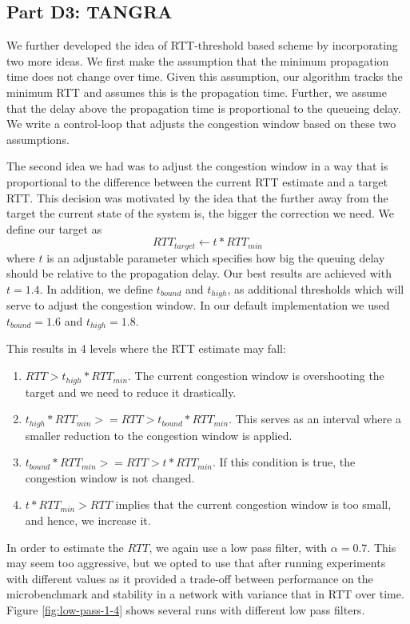\documentclass[12pt]{article}
\begin{document}
\subsection*{Part D3: TANGRA}

We further developed the idea of RTT-threshold based scheme by incorporating two
more ideas. We first make the assumption that the minimum propagation time does
not change over time. Given this assumption, our algorithm tracks the minimum
RTT and assumes this is the propagation time. Further, we assume that the delay
above the propagation time is proportional to the queueing delay. We write a
control-loop that adjusts the congestion window based on these two assumptions.

The second idea we had was to adjust the congestion window in a way that is
proportional to the difference between the current RTT estimate and a target
RTT. This decision was motivated by the idea that the further away from the
target the current state of the system is, the bigger the correction we need. We
define our target as
$$RTT_{target} \leftarrow t * {RTT}_{min}$$
where $t$ is an adjustable parameter which specifies how big the queuing delay
should be relative to the propagation delay. Our best results are achieved with
$t = 1.4$. In addition, we define $t_{bound}$ and $t_{high}$, as additional
thresholds which will serve to adjust the congestion window. In our default
implementation we used $t_{bound} = 1.6$ and $t_{high} = 1.8$.

This results in 4 levels where the RTT estimate may fall:
\begin{enumerate}
\item $RTT > t_{high} * RTT_{min}$. The current congestion window is
overshooting the target and we need to reduce it drastically.
\item $t_{high}*RTT_{min} >= RTT > t_{bound}*RTT_{min}$. This serves as an
interval where a smaller reduction to the congestion window is applied.
\item $t_{bound} *RTT_{min} >= RTT > t * {RTT_{min}}$. If this condition is
true, the congestion window is not changed.
\item $t * RTT_{min} > RTT$ implies that the current congestion window is too
small, and hence, we increase it.
\end{enumerate}

In order to estimate the $RTT$, we again use a low pass filter, with $\alpha =
0.7$. This may seem too aggressive, but we opted to use that after running
experiments with different values as it provided a trade-off between performance
on the microbenchmark and stability in a network with variance that in RTT over
time. Figure \ref{fig:low-pass-1-4} shows several runs with different low pass
filters.
\end{document}
